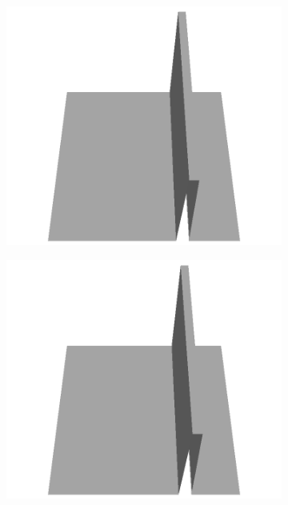 \documentclass[../document.tex]{subfiles}
\begin{document}
\begin{figure}[H]
\begin{subfigure}[b]{0.065\textwidth}
    \includegraphics[width=\linewidth]{../img/5/custom_patches/walls_front/all/41-3d.png}
    \end{subfigure}
    \begin{subfigure}[b]{0.065\textwidth}
    \includegraphics[width=\linewidth]{../img/5/custom_patches/walls_front/all/40-3d.png}
    \end{subfigure}
    \begin{subfigure}[b]{0.065\textwidth}

\end{subfigure}
\end{figure}
\end{document}
